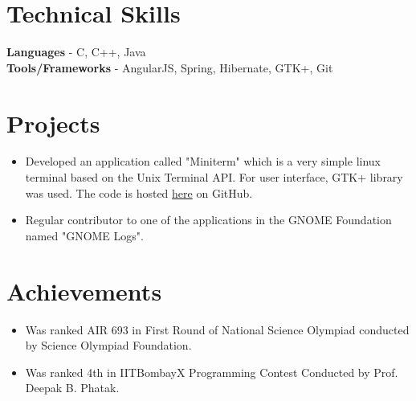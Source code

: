 \documentclass[12pt,margin, centered]{res}
\begin{document}
\begin{resume}
\section{Technical \hspace{2mm} Skills}
\vspace{10mm}
\textbf{Languages} - C, C++, Java \\
\textbf{Tools/Frameworks} -  AngularJS, Spring, Hibernate, GTK+, Git

\section{Projects}
\vspace{10mm}
\begin{itemize}[leftmargin=*]
 \item Developed an application called "Miniterm" which is a very simple linux terminal based on the Unix Terminal API. For user interface, GTK+ library was used. The code is hosted \href{https://github.com/pranavg189/miniterm}{here} on GitHub.
 \item Regular contributor to one of the applications in the GNOME Foundation named "GNOME Logs".
\end{itemize}


\section{Achievements}
\vspace{12mm}
\begin{itemize}[leftmargin=*]
 \item Was ranked AIR 693 in First Round of National Science Olympiad conducted by Science Olympiad Foundation.
 \item Was ranked 4th in IITBombayX Programming Contest Conducted by Prof. Deepak B. Phatak.
\end{itemize}


\end{resume}
\end{document}
